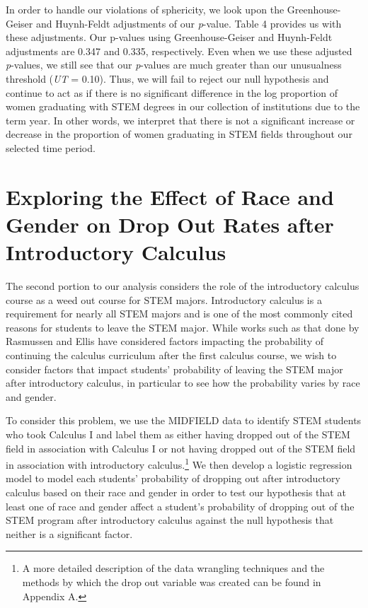 \documentclass[]{article}
\begin{document}
In order to handle our violations of sphericity, we look upon the
Greenhouse-Geiser and Huynh-Feldt adjustments of our \emph{p}-value.
Table 4 provides us with these adjustments. Our p-values using
Greenhouse-Geiser and Huynh-Feldt adjustments are 0.347 and 0.335,
respectively. Even when we use these adjusted \emph{p}-values, we still
see that our \emph{p}-values are much greater than our unusualness
threshold (\emph{UT} = 0.10). Thus, we will fail to reject our null
hypothesis and continue to act as if there is no significant difference
in the log proportion of women graduating with STEM degrees in our
collection of institutions due to the term year. In other words, we
interpret that there is not a significant increase or decrease in the
proportion of women graduating in STEM fields throughout our selected
time period.

\section{Exploring the Effect of Race and Gender on Drop Out Rates after
Introductory
Calculus}\label{exploring-the-effect-of-race-and-gender-on-drop-out-rates-after-introductory-calculus}

The second portion to our analysis considers the role of the
introductory calculus course as a weed out course for STEM majors.
Introductory calculus is a requirement for nearly all STEM majors and is
one of the most commonly cited reasons for students to leave the STEM
major. \cite{paper} While works such as that done by Rasmussen and Ellis
have considered factors impacting the probability of continuing the
calculus curriculum after the first calculus course, we wish to consider
factors that impact students' probability of leaving the STEM major
after introductory calculus, in particular to see how the probability
varies by race and gender.

To consider this problem, we use the MIDFIELD data to identify STEM
students who took Calculus I and label them as either having dropped out
of the STEM field in association with Calculus I or not having dropped
out of the STEM field in association with introductory
calculus.\footnote{A more detailed description of the data wrangling techniques and the methods by which the drop out variable was created can be found in Appendix A.}
We then develop a logistic regression model to model each students'
probability of dropping out after introductory calculus based on their
race and gender in order to test our hypothesis that at least one of
race and gender affect a student's probability of dropping out of the
STEM program after introductory calculus against the null hypothesis
that neither is a significant factor.
\end{document}
